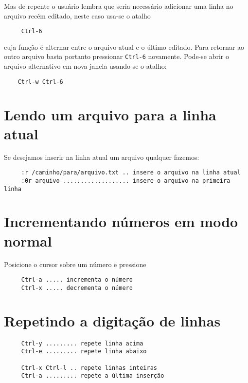 Mas de repente o usuário lembra que seria necessário adicionar uma linha no
arquivo recém editado, neste caso usa-se o atalho

\begin{verbatim}
     Ctrl-6
\end{verbatim}

cuja função é alternar entre o arquivo atual e o último editado. Para retornar
ao outro arquivo basta portanto pressionar \verb|Ctrl-6| novamente. Pode-se 
abrir o arquivo alternativo em nova janela usando-se o atalho:

\begin{verbatim}
    Ctrl-w Ctrl-6
\end{verbatim}

\section{Lendo um arquivo para a linha atual}
\label{sec:Lendo um arquivo para a linha atual}

Se desejamos inserir na linha atual um arquivo qualquer fazemos:

\begin{verbatim}
	 :r /caminho/para/arquivo.txt .. insere o arquivo na linha atual
	 :0r arquivo ................... insere o arquivo na primeira linha
\end{verbatim}


\section{Incrementando números em modo normal}\label{Incrementando números em modo normal}

Posicione o cursor sobre um número e pressione

\begin{verbatim}
     Ctrl-a ..... incrementa o número
     Ctrl-x ..... decrementa o número
\end{verbatim}

\section{Repetindo a digitação de linhas}
\label{Repetindo a digitação de linhas}

\begin{verbatim}
     Ctrl-y ......... repete linha acima
     Ctrl-e ......... repete linha abaixo
     
     Ctrl-x Ctrl-l .. repete linhas inteiras
     Ctrl-a ......... repete a última inserção
\end{verbatim}

